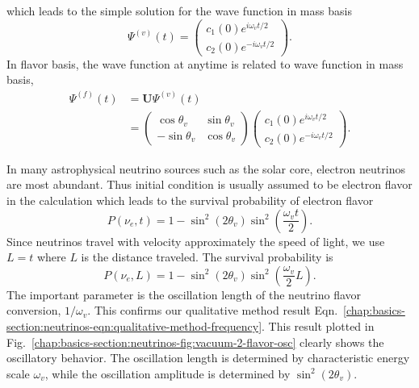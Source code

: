 which leads to the simple solution for the wave function in mass basis
\begin{equation}
\Psi^{(v)}(t) = \begin{pmatrix}
c_1(0) e^{i \omega_v t/2 } \\
c_2(0) e^{ -i\omega_v t/2 }
\end{pmatrix}.
\end{equation}
In flavor basis, the wave function at anytime is related to wave function in mass basis,
\begin{align}
\Psi^{(f)}(t) &= \mathbf{U}\Psi^{(v)}(t) \\
& = \begin{pmatrix} \cos\theta_v & \sin \theta_v \\ -\sin \theta_v & \cos \theta_v \end{pmatrix} \begin{pmatrix} c_1(0) e^{i\omega_v t/2 } \\
c_2(0) e^{ -i\omega_v t/2 }    \end{pmatrix} .
\end{align}

In many astrophysical neutrino sources such as the solar core, electron neutrinos are most abundant. Thus initial condition is usually assumed to be electron flavor in the calculation which leads to the survival probability of electron flavor
\begin{equation}
P(\nu_e,t) = 1-\sin^2(2\theta_v)\sin^2\left( \frac{\omega_v t}{2} \right).
\end{equation}
Since neutrinos travel with velocity approximately the speed of light, we use $L = t$ where $L$ is the distance traveled. The survival probability is
\begin{equation}
P(\nu_e,L) =  1-\sin^2(2\theta_v)\sin^2\left( \frac{\omega_v}{2} L \right).
\end{equation}
The important parameter is the oscillation length of the neutrino flavor conversion, $1/\omega_v$. This confirms our qualitative method result Eqn.~\ref{chap:basics-section:neutrinos-eqn:qualitative-method-frequency}. This result plotted in Fig.~\ref{chap:basics-section:neutrinos-fig:vacuum-2-flavor-osc} clearly shows the oscillatory behavior. The oscillation length is determined by characteristic energy scale $\omega_v$, while the oscillation amplitude is determined by $\sin^2(2\theta_v)$.

